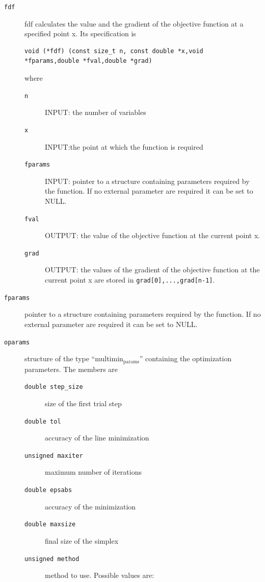 \documentclass[11pt]{article}
\begin{document}
\begin{description}
\item[\texttt{fdf}] fdf calculates the value and the gradient of the objective
           function at a specified point x. Its specification is

\begin{verbatim}
void (*fdf) (const size_t n, const double *x,void *fparams,double *fval,double *grad)
\end{verbatim}

         where
\begin{description}
\item[\texttt{n}] INPUT: the number of variables
\item[\texttt{x}] INPUT:the point at which the function is required
\item[\texttt{fparams}] INPUT: pointer to a structure containing
                     parameters required by the function. If no
                     external parameter are required it can be set to
                     NULL.
\item[\texttt{fval}] OUTPUT: the value of the objective function at
                     the current point x.
\item[\texttt{grad}] OUTPUT: the values of the gradient of the
                     objective function at the current point x are
                     stored in \texttt{grad[0],...,grad[n-1]}.
\end{description}
\item[\texttt{fparams}] pointer to a structure containing parameters required
               by the function. If no external parameter are required
               it can be set to NULL.
\item[\texttt{oparams}] structure of the type ``multimin$_{\mathrm{params}}$'' containing the
               optimization parameters. The members are
\begin{description}
\item[\texttt{double step\_size}] size of the first trial step
\item[\texttt{double tol}] accuracy of the line minimization
\item[\texttt{unsigned maxiter}] maximum number of iterations
\item[\texttt{double epsabs}] accuracy of the minimization
\item[\texttt{double maxsize}] final size of the simplex
\item[\texttt{unsigned method}] method to use. Possible values are:
\begin{enumerate}

\end{enumerate}
\end{description}
\end{description}
\end{document}
